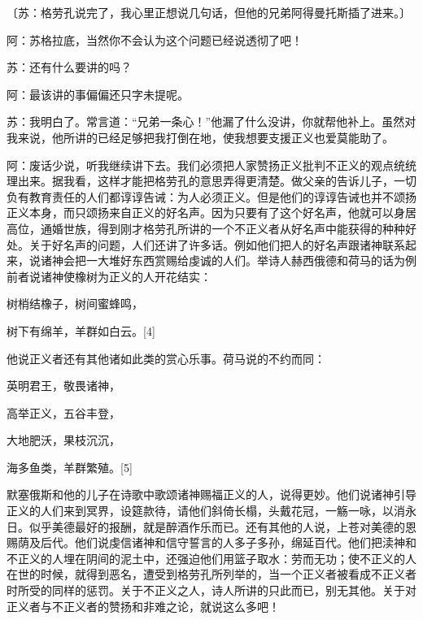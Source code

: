 \documentclass[12pt,oneside]{book}
\begin{document}
〔苏：格劳孔说完了，我心里正想说几句话，但他的兄弟阿得曼托斯插了进来。〕

阿：苏格拉底，当然你不会认为这个问题已经说透彻了吧！

苏：还有什么要讲的吗？

阿：最该讲的事偏偏还只字未提呢。

苏：我明白了。常言道：“兄弟一条心！”他漏了什么没讲，你就帮他补上。虽然对我来说，他所讲的已经足够把我打倒在地，使我想要支援正义也爱莫能助了。

阿：废话少说，听我继续讲下去。我们必须把人家赞扬正义批判不正义的观点统统理出来。据我看，这样才能把格劳孔的意思弄得更清楚。做父亲的告诉儿子，一切负有教育责任的人们都谆谆告诫：为人必须正义。但是他们的谆谆告诫也并不颂扬正义本身，而只颂扬来自正义的好名声。因为只要有了这个好名声，他就可以身居高位，通婚世族，得到刚才格劳孔所讲的一个不正义者从好名声中能获得的种种好处。关于好名声的问题，人们还讲了许多话。例如他们把人的好名声跟诸神联系起来，说诸神会把一大堆好东西赏赐给虔诚的人们。举诗人赫西俄德和荷马的话为例前者说诸神使橡树为正义的人开花结实：





树梢结橡子，树间蜜蜂鸣，

树下有绵羊，羊群如白云。[4]





他说正义者还有其他诸如此类的赏心乐事。荷马说的不约而同：





英明君王，敬畏诸神，

高举正义，五谷丰登，

大地肥沃，果枝沉沉，

海多鱼类，羊群繁殖。[5]





默塞俄斯和他的儿子在诗歌中歌颂诸神赐福正义的人，说得更妙。他们说诸神引导正义的人们来到冥界，设筵款待，请他们斜倚长榻，头戴花冠，一觞一咏，以消永日。似乎美德最好的报酬，就是醉酒作乐而已。还有其他的人说，上苍对美德的恩赐荫及后代。他们说虔信诸神和信守誓言的人多子多孙，绵延百代。他们把渎神和不正义的人埋在阴间的泥土中，还强迫他们用篮子取水：劳而无功；使不正义的人在世的时候，就得到恶名，遭受到格劳孔所列举的，当一个正义者被看成不正义者时所受的同样的惩罚。关于不正义之人，诗人所讲的只此而已，别无其他。关于对正义者与不正义者的赞扬和非难之论，就说这么多吧！
\end{document}
